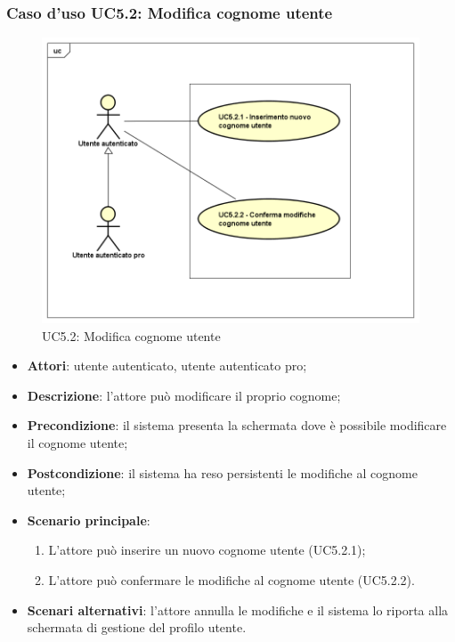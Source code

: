 \subsubsection{Caso d'uso UC5.2: Modifica cognome utente}
\label{UC5.2}
\begin{figure}[h]
	\centering
	\includegraphics[scale=0.5,keepaspectratio]{UML/UC5_2.png}
	\caption{UC5.2: Modifica cognome utente}
\end{figure}
\begin{itemize}
	\item \textbf{Attori}: utente autenticato, utente autenticato pro;
	\item \textbf{Descrizione}: l'attore può modificare il proprio cognome;
	\item \textbf{Precondizione}: il sistema presenta la schermata dove è possibile modificare il cognome utente;
	\item \textbf{Postcondizione}: il sistema ha reso persistenti le modifiche al cognome utente;
	\item \textbf{Scenario principale}:
	\begin{enumerate}
		\item L'attore può inserire un nuovo cognome utente (UC5.2.1);
		\item L'attore può confermare le modifiche al cognome utente (UC5.2.2).
	\end{enumerate}
	\item \textbf{Scenari alternativi}: l'attore annulla le modifiche e il sistema lo riporta alla schermata di gestione del profilo utente.
\end{itemize}

